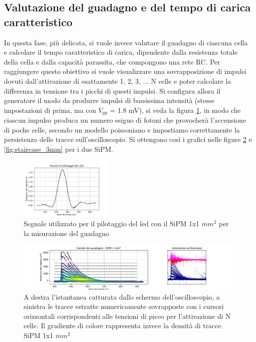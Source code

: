 \documentclass[journal]{IEEEtran}
\begin{document}
\subsection{\textbf{Valutazione del guadagno e del tempo di carica caratteristico}}
In questa fase, più delicata, si vuole invece valutare il guadagno di ciascuna cella e calcolare il tempo caratteristico di carica, dipendente dalla resistenza totale della cella e dalla capacità parassita, che compongono una rete RC. Per raggiungere questo obiettivo si vuole visualizzare una sovrapposizione di impulsi dovuti dall'attivazione di esattamente 1, 2, 3, ... N celle e poter calcolare la differenza in tensione tra i picchi di questi impulsi. Si configura allora il generatore il modo da produrre impulsi di bassissima intensità (stesse impostazioni di prima, ma con $V_{pp}$ = 1.8 mV), si veda la figura \ref{fig:ledp}, in modo che ciascun impulso produca un numero esiguo di fotoni che provocherà l'accensione di poche celle, secondo un modello poissoniano e impostiamo correttamente la persistenza delle tracce sull'oscilloscopio. Si ottengono così i grafici nelle figure \ref{fig:staircase_1mm} e \ref{fig:staircase_3mm} per i due SiPM. 

\begin{figure}[H]%
\begin{center}
\includegraphics[width=0.40\textwidth]{analysis/output/SiPM_ledp.pdf}
\caption{Segnale utilizzato per il pilotaggio del led con il SiPM 1x1 $mm^2$ per la misurazione del guadagno}
\label{fig:ledp}
\end{center}
\end{figure}

\begin{figure}[t]%
\centering
\begin{center}
\includegraphics[trim = {100pt 0 0 0}, width=1.15\textwidth]{analysis/output/SiPM_1mm_gain_staircase.pdf}
\end{center}
\caption{A destra l'istantanea catturata dallo schermo dell'oscilloscopio, a sinistra le tracce estratte numericamente sovrapposte con i cursori orizzontali corrispondenti alle tensioni di picco per l'attivazione di N celle. Il gradiente di colore rappresenta invece la densità di tracce. SiPM 1x1 $mm^2$}
\label{fig:staircase_1mm}
\end{figure}
\end{document}
